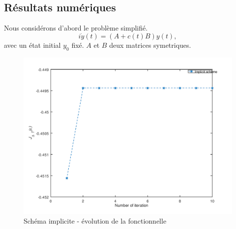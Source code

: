 \subsection{Résultats numériques}
Nous considérons d'abord le problème simplifié.
\begin{equation}
i\dot y(t)= (A+c(t)B)y(t),
\end{equation}
avec un état initial $y_0$ fixé. $A$ et $B$ deux matrices symetriques.\\
\begin{figure}[H]
	\caption{Schéma implicite - évolution de la fonctionnelle}
	\centering
	\includegraphics[scale=0.7]{images/implicit_func.png}
\end{figure}

